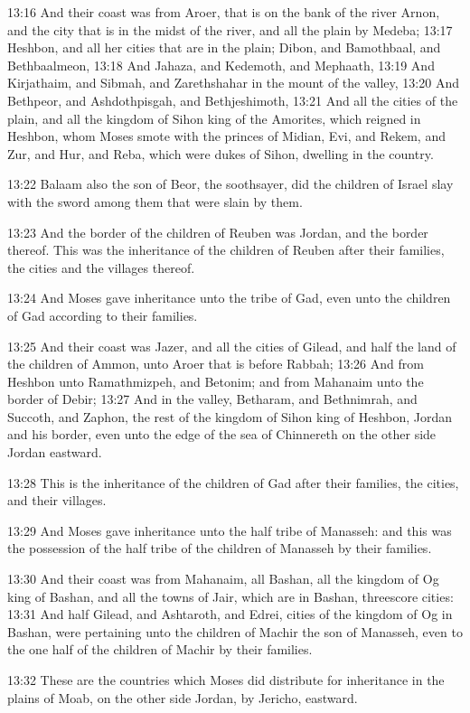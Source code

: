 13:16 And their coast was from Aroer, that is on the bank of the river
Arnon, and the city that is in the midst of the river, and all the
plain by Medeba; 13:17 Heshbon, and all her cities that are in the
plain; Dibon, and Bamothbaal, and Bethbaalmeon, 13:18 And Jahaza, and
Kedemoth, and Mephaath, 13:19 And Kirjathaim, and Sibmah, and
Zarethshahar in the mount of the valley, 13:20 And Bethpeor, and
Ashdothpisgah, and Bethjeshimoth, 13:21 And all the cities of the
plain, and all the kingdom of Sihon king of the Amorites, which
reigned in Heshbon, whom Moses smote with the princes of Midian, Evi,
and Rekem, and Zur, and Hur, and Reba, which were dukes of Sihon,
dwelling in the country.

13:22 Balaam also the son of Beor, the soothsayer, did the children of
Israel slay with the sword among them that were slain by them.

13:23 And the border of the children of Reuben was Jordan, and the
border thereof. This was the inheritance of the children of Reuben
after their families, the cities and the villages thereof.

13:24 And Moses gave inheritance unto the tribe of Gad, even unto the
children of Gad according to their families.

13:25 And their coast was Jazer, and all the cities of Gilead, and
half the land of the children of Ammon, unto Aroer that is before
Rabbah; 13:26 And from Heshbon unto Ramathmizpeh, and Betonim; and
from Mahanaim unto the border of Debir; 13:27 And in the valley,
Betharam, and Bethnimrah, and Succoth, and Zaphon, the rest of the
kingdom of Sihon king of Heshbon, Jordan and his border, even unto the
edge of the sea of Chinnereth on the other side Jordan eastward.

13:28 This is the inheritance of the children of Gad after their
families, the cities, and their villages.

13:29 And Moses gave inheritance unto the half tribe of Manasseh: and
this was the possession of the half tribe of the children of Manasseh
by their families.

13:30 And their coast was from Mahanaim, all Bashan, all the kingdom
of Og king of Bashan, and all the towns of Jair, which are in Bashan,
threescore cities: 13:31 And half Gilead, and Ashtaroth, and Edrei,
cities of the kingdom of Og in Bashan, were pertaining unto the
children of Machir the son of Manasseh, even to the one half of the
children of Machir by their families.

13:32 These are the countries which Moses did distribute for
inheritance in the plains of Moab, on the other side Jordan, by
Jericho, eastward.

